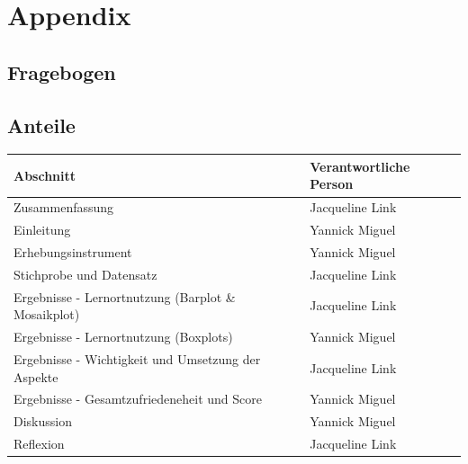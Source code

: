 \documentclass[11pt, a4paper]{article}
\begin{document}
\newpage
\section{Appendix}
\subsection{Fragebogen}

\begin{figure}[h]
	
\end{figure}
\pagestyle{plain}
\newpage
\begin{figure}[h]
	
\end{figure}
\newpage
\begin{figure}[h]
	
\end{figure}
\newpage
\begin{figure}[h]
	
\end{figure}
\newpage
\subsection{Anteile}
\begin{table}[h]
	\begin{tabular}{l|l}
		Abschnitt                                          & Verantwortliche Person \\ \hline
		Zusammenfassung                                    & Jacqueline Link        \\
		Einleitung                                         & Yannick Miguel         \\
		Erhebungsinstrument                                & Yannick Miguel         \\
		Stichprobe und Datensatz                           &
		Jacqueline Link        \\
		Ergebnisse - Lernortnutzung (Barplot \& Mosaikplot)                       & Jacqueline Link        \\
		Ergebnisse - Lernortnutzung (Boxplots)                       & Yannick Miguel       \\
		Ergebnisse - Wichtigkeit und Umsetzung der Aspekte & Jacqueline Link        \\
		Ergebnisse - Gesamtzufriedeneheit und Score        & Yannick Miguel         \\
		Diskussion                                         & Yannick Miguel         \\
		Reflexion                                          & Jacqueline Link       
	\end{tabular}
\end{table}
\end{document}
